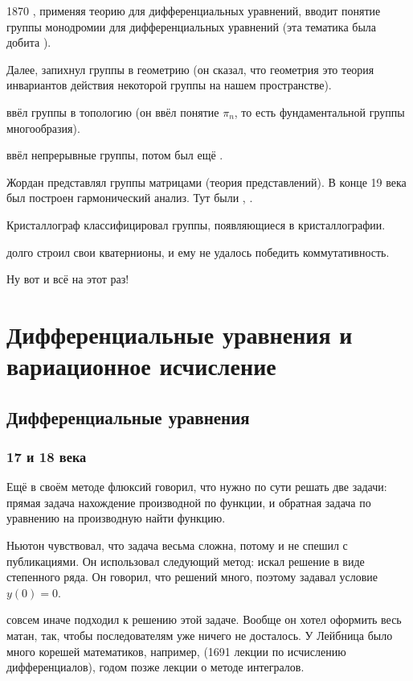 \documentclass[a4paper,oneside,fleqn,10pt]{article}
\begin{document}
1870 , применяя теорию  для дифференциальных
уравнений, вводит понятие группы монодромии для дифференциальных
уравнений (эта тематика была добита ).

Далее,  запихнул группы в геометрию (он сказал, что
геометрия это теория инвариантов действия некоторой группы на нашем
пространстве).

 ввёл группы в топологию (он ввёл понятие $\pi_n$, то
есть фундаментальной группы многообразия).

 ввёл непрерывные группы, потом был ещё
.

Жордан представлял группы матрицами (теория представлений).  В конце
19 века был построен гармонический анализ.  Тут были
, .

Кристаллограф  классифицировал группы, появляющиеся в
кристаллографии.

 долго строил свои кватернионы, и ему не удалось
победить коммутативность.

Ну вот и всё на этот раз!



\section{Дифференциальные уравнения и вариационное исчисление}

\subsection{Дифференциальные уравнения}

\subsubsection{17 и 18 века}

Ещё  в своём методе флюксий говорил, что нужно по сути
решать две задачи: прямая задача нахождение производной по функции, и
обратная задача по уравнению на производную найти функцию.

Ньютон чувствовал, что задача весьма сложна, потому и не спешил с
публикациями.  Он использовал следующий метод: искал решение в виде
степенного ряда.  Он говорил, что решений много, поэтому задавал
условие $y(0) = 0$.

 совсем иначе подходил к решению этой задаче. Вообще он
хотел оформить весь матан, так, чтобы последователям уже ничего не
досталось. У Лейбница было много корешей математиков, например,
 (1691 лекции по исчислению
дифференциалов), годом позже лекции о методе интегралов.
\end{document}
